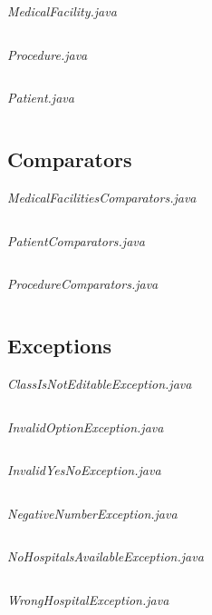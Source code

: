 \documentclass{article}
\begin{document}
	\textit{MedicalFacility.java}
	\inputminted{java}{src/main/java/com/yvesstraten/medicalconsole/facilities/MedicalFacility.java}

	\textit{Procedure.java}
	\inputminted{java}{src/main/java/com/yvesstraten/medicalconsole/facilities/Procedure.java}

	\textit{Patient.java}
	\inputminted{java}{src/main/java/com/yvesstraten/medicalconsole/Patient.java}

	\pagebreak
	
	\subsection{Comparators}\label{sub:comparators} %
	\textit{MedicalFacilitiesComparators.java}
	\inputminted{java}{src/main/java/com/yvesstraten/medicalconsole/comparators/MedicalFacilitiesComparators.java}

	\textit{PatientComparators.java}
	\inputminted{java}{src/main/java/com/yvesstraten/medicalconsole/comparators/PatientComparators.java}

	\textit{ProcedureComparators.java}
	\inputminted{java}{src/main/java/com/yvesstraten/medicalconsole/comparators/ProcedureComparators.java}

  \newpage

	\subsection{Exceptions}\label{sub:exceptions} %
	\textit{ClassIsNotEditableException.java}
	\inputminted{java}{src/main/java/com/yvesstraten/medicalconsole/exceptions/ClassIsNotEditableException.java}

	\textit{InvalidOptionException.java}
	\inputminted{java}{src/main/java/com/yvesstraten/medicalconsole/exceptions/InvalidOptionException.java}

	\textit{InvalidYesNoException.java}
	\inputminted{java}{src/main/java/com/yvesstraten/medicalconsole/exceptions/InvalidYesNoException.java}

	\textit{NegativeNumberException.java}
	\inputminted{java}{src/main/java/com/yvesstraten/medicalconsole/exceptions/NegativeNumberException.java}

	\textit{NoHospitalsAvailableException.java}
	\inputminted{java}{src/main/java/com/yvesstraten/medicalconsole/exceptions/NoHospitalsAvailableException.java}

	\textit{WrongHospitalException.java}
	\inputminted{java}{src/main/java/com/yvesstraten/medicalconsole/exceptions/WrongHospitalException.java}
\end{document}
